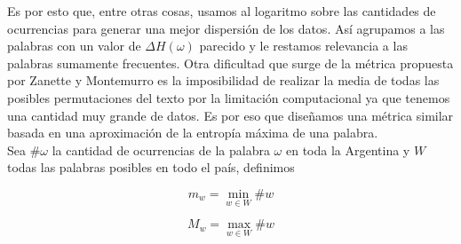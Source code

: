 Es por esto que, entre otras cosas, usamos al logaritmo sobre las cantidades de ocurrencias para generar una mejor dispersión de los datos. Así agrupamos a las palabras con un valor de $\Delta H(\omega)$ parecido y le restamos relevancia a las palabras sumamente frecuentes. Otra dificultad que surge de la métrica propuesta por Zanette y Montemurro es la imposibilidad de realizar la media de todas las posibles permutaciones del texto por la limitación computacional ya que 
tenemos una cantidad muy grande de datos. Es por eso que diseñamos una métrica similar basada en una aproximación de la entropía máxima de una palabra.\\


Sea $\# \omega$ la cantidad de ocurrencias de la palabra $\omega$ en toda la Argentina y $W$ todas las palabras posibles en todo el país, definimos\\


\noindent\begin{minipage}{.5\linewidth}
\begin{equation}
  m_w = \min \limits_{w \in W} \# w
\end{equation}
\end{minipage}%
\begin{minipage}{.5\linewidth}
\begin{equation}
  M_w = \max \limits_{w \in W} \# w
\end{equation}
\end{minipage}\\

